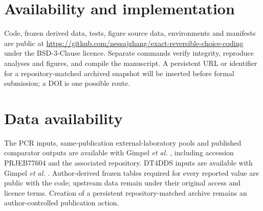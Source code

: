 \documentclass[unnumsec,webpdf,modern,large]{oup-authoring-template}
\begin{document}
\section*{Availability and implementation}

Code, frozen derived data, tests, figure source data, environments and manifests are public at \url{https://github.com/nessajzhang/exact-reversible-choice-coding} under the BSD-3-Clause licence. Separate commands verify integrity, reproduce analyses and figures, and compile the manuscript. A persistent URL or identifier for a repository-matched archived snapshot will be inserted before formal submission; a DOI is one possible route.

\section*{Data availability}

The PCR inputs, same-publication external-laboratory pools and published comparator outputs are available with Gimpel \emph{et al.} \cite{gimpel2025pcrbias}, including accession PRJEB77604 and the associated repository. DT4DDS inputs are available with Gimpel \emph{et al.} \cite{gimpel2023digitaltwin}. Author-derived frozen tables required for every reported value are public with the code; upstream data remain under their original access and licence terms. Creation of a persistent repository-matched archive remains an author-controlled publication action.

\begingroup
\footnotesize


\endgroup
\end{document}
